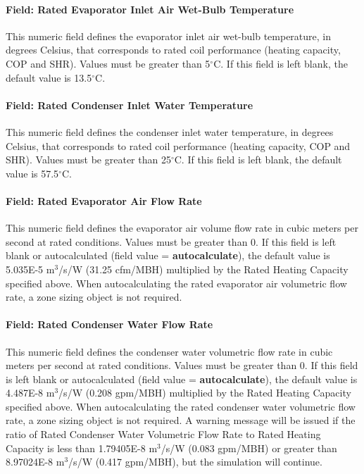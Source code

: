 \paragraph{Field: Rated Evaporator Inlet Air Wet-Bulb Temperature}\label{field-rated-evaporator-inlet-air-wet-bulb-temperature}

This numeric field defines the evaporator inlet air wet-bulb temperature, in degrees Celsius, that corresponds to rated coil performance (heating capacity, COP and SHR). Values must be greater than 5$^\circ$C. If this field is left blank, the default value is 13.5$^\circ$C.

\paragraph{Field: Rated Condenser Inlet Water Temperature}\label{field-rated-condenser-inlet-water-temperature}

This numeric field defines the condenser inlet water temperature, in degrees Celsius, that corresponds to rated coil performance (heating capacity, COP and SHR). Values must be greater than 25$^\circ$C. If this field is left blank, the default value is 57.5$^\circ$C.

\paragraph{Field: Rated Evaporator Air Flow Rate}\label{field-rated-evaporator-air-flow-rate}

This numeric field defines the evaporator air volume flow rate in cubic meters per second at rated conditions. Values must be greater than 0. If this field is left blank or autocalculated (field value = \textbf{autocalculate}), the default value is 5.035E-5 m\(^{3}\)/s/W (31.25 cfm/MBH) multiplied by the Rated Heating Capacity specified above. When autocalculating the rated evaporator air volumetric flow rate, a zone sizing object is not required.

\paragraph{Field: Rated Condenser Water Flow Rate}\label{field-rated-condenser-water-flow-rate}

This numeric field defines the condenser water volumetric flow rate in cubic meters per second at rated conditions. Values must be greater than 0. If this field is left blank or autocalculated (field value = \textbf{autocalculate}), the default value is 4.487E-8 m\(^{3}\)/s/W (0.208 gpm/MBH) multiplied by the Rated Heating Capacity specified above. When autocalculating the rated condenser water volumetric flow rate, a zone sizing object is not required. A warning message will be issued if the ratio of Rated Condenser Water Volumetric Flow Rate to Rated Heating Capacity is less than 1.79405E-8 m\(^{3}\)/s/W (0.083 gpm/MBH) or greater than 8.97024E-8 m\(^{3}\)/s/W (0.417 gpm/MBH), but the simulation will continue.

